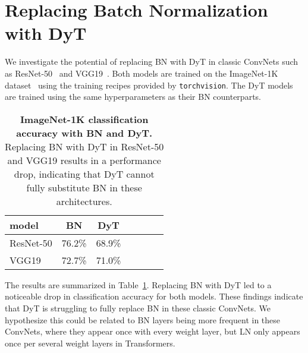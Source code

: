 
\section{Replacing Batch Normalization with DyT}
\label{section:batch_normalization}

We investigate the potential of replacing BN with DyT in classic ConvNets such as ResNet-50~\citep{he2016deep} and VGG19~\citep{simonyan2014very}.
Both models are trained on the ImageNet-1K dataset~\citep{deng2009imagenet} using the training recipes provided by \texttt{torchvision}. The DyT models are trained using the same hyperparameters as their BN counterparts.

\begin{table}[h]
\centering
{}
\begin{tabular}{lcccccc}
\toprule
model & BN & DyT \\
\midrule
ResNet-50 & 76.2\% & 68.9\% \\
VGG19   & 72.7\% & 71.0\% \\
\midrule
\end{tabular}
\caption{\textbf{ImageNet-1K classification accuracy with BN and DyT.} Replacing BN with DyT in ResNet-50 and VGG19 results in a performance drop, indicating that DyT cannot fully substitute BN in these architectures.}
\label{table:bn_ablation}
\end{table}

The results are summarized in Table~\ref{table:bn_ablation}. Replacing BN with DyT led to a noticeable drop in classification accuracy for both models. These findings indicate that DyT is struggling to fully replace BN in these classic ConvNets. We hypothesize this could be related to BN layers being more frequent in these ConvNets, where they appear once with every weight layer, but LN only appears once per several weight layers in Transformers.